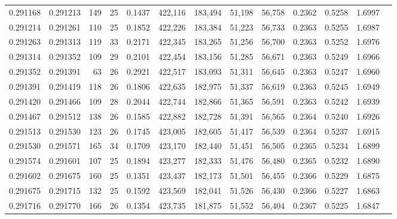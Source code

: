 \begin{tabular}{rrrrrrrrrrrrr}
0.291168 & 0.291213 &   149 &  25 &                                     0.1437 & 422,116 & 183,494 &  51,198 &  56,758 & 0.2362 & 0.5258 & 1.6997 \\
0.291214 & 0.291261 &   110 &  25 &                                     0.1852 & 422,226 & 183,384 &  51,223 &  56,733 & 0.2363 & 0.5255 & 1.6987 \\
0.291263 & 0.291313 &   119 &  33 &                                     0.2171 & 422,345 & 183,265 &  51,256 &  56,700 & 0.2363 & 0.5252 & 1.6976 \\
0.291314 & 0.291352 &   109 &  29 &                                     0.2101 & 422,454 & 183,156 &  51,285 &  56,671 & 0.2363 & 0.5249 & 1.6966 \\
0.291352 & 0.291391 &    63 &  26 &                                     0.2921 & 422,517 & 183,093 &  51,311 &  56,645 & 0.2363 & 0.5247 & 1.6960 \\
0.291391 & 0.291419 &   118 &  26 &                                     0.1806 & 422,635 & 182,975 &  51,337 &  56,619 & 0.2363 & 0.5245 & 1.6949 \\
0.291420 & 0.291466 &   109 &  28 &                                     0.2044 & 422,744 & 182,866 &  51,365 &  56,591 & 0.2363 & 0.5242 & 1.6939 \\
0.291467 & 0.291512 &   138 &  26 &                                     0.1585 & 422,882 & 182,728 &  51,391 &  56,565 & 0.2364 & 0.5240 & 1.6926 \\
0.291513 & 0.291530 &   123 &  26 &                                     0.1745 & 423,005 & 182,605 &  51,417 &  56,539 & 0.2364 & 0.5237 & 1.6915 \\
0.291530 & 0.291571 &   165 &  34 &                                     0.1709 & 423,170 & 182,440 &  51,451 &  56,505 & 0.2365 & 0.5234 & 1.6899 \\
0.291574 & 0.291601 &   107 &  25 &                                     0.1894 & 423,277 & 182,333 &  51,476 &  56,480 & 0.2365 & 0.5232 & 1.6890 \\
0.291602 & 0.291675 &   160 &  25 &                                     0.1351 & 423,437 & 182,173 &  51,501 &  56,455 & 0.2366 & 0.5229 & 1.6875 \\
0.291675 & 0.291715 &   132 &  25 &                                     0.1592 & 423,569 & 182,041 &  51,526 &  56,430 & 0.2366 & 0.5227 & 1.6863 \\
0.291716 & 0.291770 &   166 &  26 &                                     0.1354 & 423,735 & 181,875 &  51,552 &  56,404 & 0.2367 & 0.5225 & 1.6847 \\

\end{tabular}
